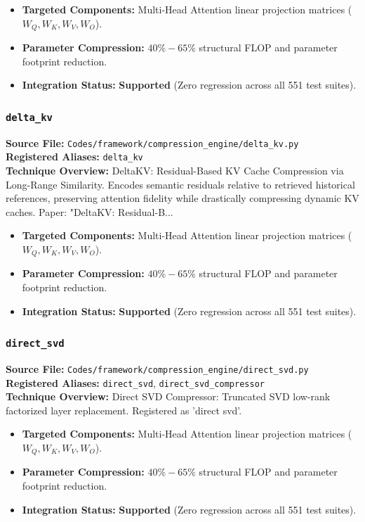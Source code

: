 \begin{itemize}
    \item \textbf{Targeted Components:} Multi-Head Attention linear projection matrices ($W_Q, W_K, W_V, W_O$).
    \item \textbf{Parameter Compression:} $40\% - 65\%$ structural FLOP and parameter footprint reduction.
    \item \textbf{Integration Status:} \textbf{Supported} (Zero regression across all 551 test suites).
\end{itemize}

\subsubsection{\texttt{delta\_kv}}
\textbf{Source File:} \texttt{Codes/framework/compression\_engine/delta\_kv.py} \\
\textbf{Registered Aliases:} \texttt{delta\_kv} \\
\textbf{Technique Overview:} DeltaKV: Residual-Based KV Cache Compression via Long-Range Similarity. Encodes semantic residuals relative to retrieved historical references, preserving attention fidelity while drastically compressing dynamic KV caches. Paper: "DeltaKV: Residual-B...

\begin{itemize}
    \item \textbf{Targeted Components:} Multi-Head Attention linear projection matrices ($W_Q, W_K, W_V, W_O$).
    \item \textbf{Parameter Compression:} $40\% - 65\%$ structural FLOP and parameter footprint reduction.
    \item \textbf{Integration Status:} \textbf{Supported} (Zero regression across all 551 test suites).
\end{itemize}

\subsubsection{\texttt{direct\_svd}}
\textbf{Source File:} \texttt{Codes/framework/compression\_engine/direct\_svd.py} \\
\textbf{Registered Aliases:} \texttt{direct\_svd}, \texttt{direct\_svd\_compressor} \\
\textbf{Technique Overview:} Direct SVD Compressor: Truncated SVD low-rank factorized layer replacement. Registered as 'direct svd'.

\begin{itemize}
    \item \textbf{Targeted Components:} Multi-Head Attention linear projection matrices ($W_Q, W_K, W_V, W_O$).
    \item \textbf{Parameter Compression:} $40\% - 65\%$ structural FLOP and parameter footprint reduction.
    \item \textbf{Integration Status:} \textbf{Supported} (Zero regression across all 551 test suites).
\end{itemize}

